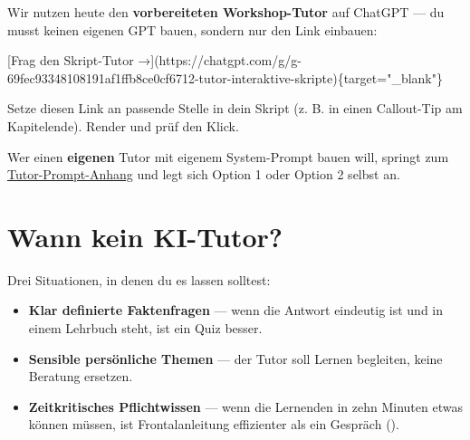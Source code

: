 \documentclass[
  ngerman,
  a4paper,
  DIV=11]{scrreprt}
\newenvironment{Shaded}{\begin{snugshade}}{\end{snugshade}}
\newcommand{\CommentTok}[1]{\textcolor[rgb]{0.37,0.37,0.37}{#1}}
\newcommand{\NormalTok}[1]{\textcolor[rgb]{0.00,0.23,0.31}{#1}}
\newcommand{\OtherTok}[1]{\textcolor[rgb]{0.00,0.23,0.31}{#1}}
\providecommand{\tightlist}{%
  \setlength{\itemsep}{0pt}\setlength{\parskip}{0pt}}
\begin{document}
\begin{tcolorbox}[enhanced jigsaw, opacitybacktitle=0.6, leftrule=.75mm, title=\textcolor{quarto-callout-tip-color}{\faLightbulb}\hspace{0.5em}{Mach mit}, colframe=quarto-callout-tip-color-frame, arc=.35mm, toprule=.15mm, colbacktitle=quarto-callout-tip-color!10!white, bottomrule=.15mm, colback=white, rightrule=.15mm, breakable, toptitle=1mm, bottomtitle=1mm, opacityback=0, titlerule=0mm, coltitle=black, left=2mm]

Wir nutzen heute den \textbf{vorbereiteten Workshop-Tutor} auf ChatGPT
--- du musst keinen eigenen GPT bauen, sondern nur den Link einbauen:

\begin{Shaded}
\begin{Highlighting}[]
\CommentTok{[}\OtherTok{Frag den Skript{-}Tutor →}\CommentTok{](https://chatgpt.com/g/g{-}69fec93348108191af1ffb8ce0cf6712{-}tutor{-}interaktive{-}skripte)}\NormalTok{\{target="\_blank"\}}
\end{Highlighting}
\end{Shaded}

Setze diesen Link an passende Stelle in dein Skript (z. B. in einen
Callout-Tip am Kapitelende). Render und prüf den Klick.

Wer einen \textbf{eigenen} Tutor mit eigenem System-Prompt bauen will,
springt zum \href{../appendix/tutor-prompt.qmd}{Tutor-Prompt-Anhang} und
legt sich Option 1 oder Option 2 selbst an.

\end{tcolorbox}

\section{\texorpdfstring{Wann \textbf{kein}
KI-Tutor?}{Wann kein KI-Tutor?}}\label{wann-kein-ki-tutor}

Drei Situationen, in denen du es lassen solltest:

\begin{itemize}
\tightlist
\item
  \textbf{Klar definierte Faktenfragen} --- wenn die Antwort eindeutig
  ist und in einem Lehrbuch steht, ist ein Quiz besser.
\item
  \textbf{Sensible persönliche Themen} --- der Tutor soll Lernen
  begleiten, keine Beratung ersetzen.
\item
  \textbf{Zeitkritisches Pflichtwissen} --- wenn die Lernenden in zehn
  Minuten etwas können müssen, ist Frontalanleitung effizienter als ein
  Gespräch ().
\end{itemize}
\end{document}
